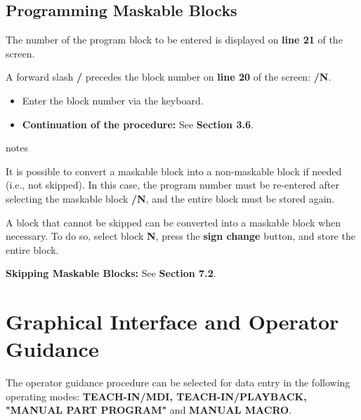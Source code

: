 \subsection{Programming Maskable Blocks}

The number of the program block to be entered is displayed on \textbf{line 21} of the screen.

\begin{itemize}
    \vspace{.1cm}
\end{itemize}
\vspace{.5cm}
A forward slash \textbf{/} precedes the block number on \textbf{line 20} of the screen: \textbf{/N}.

\begin{itemize}
    \item Enter the block number via the keyboard.
    \vspace{.5cm}
    \item \textbf{Continuation of the procedure:} See \textbf{Section 3.6}.
\end{itemize}

\vspace{.5cm}

notes

It is possible to convert a maskable block into a non-maskable block if needed (i.e., not skipped). In this case, the program number must be re-entered after selecting the maskable block \textbf{/N}, and the entire block must be stored again.

A block that cannot be skipped can be converted into a maskable block when necessary. To do so, select block \textbf{N}, press the \textbf{sign change} button, and store the entire block.

\textbf{Skipping Maskable Blocks:} See \textbf{Section 7.2}.

\newpage

\section{Graphical Interface and Operator Guidance}

The operator guidance procedure can be selected for data entry in the following operating modes: \textbf{TEACH-IN/MDI, TEACH-IN/PLAYBACK, "MANUAL PART PROGRAM"} and \textbf{MANUAL MACRO}.

